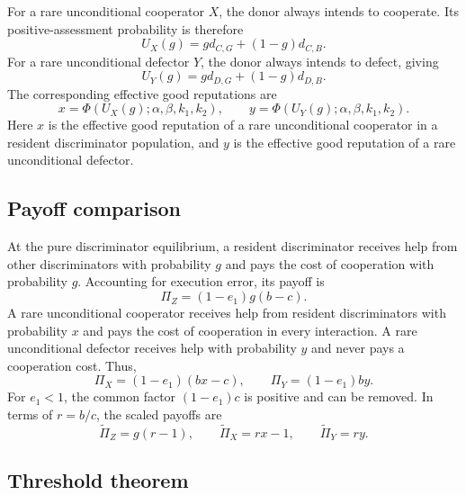 \documentclass[fleqn,10pt]{wlscirep}
\begin{document}
For a rare unconditional cooperator $X$, the donor always intends to cooperate. Its positive-assessment probability is therefore
\begin{equation}
\label{eq:allc-mutant-positive-prob}
U_X(g)=gd_{C,G}+(1-g)d_{C,B}.
\end{equation}
For a rare unconditional defector $Y$, the donor always intends to defect, giving
\begin{equation}
\label{eq:alld-mutant-positive-prob}
U_Y(g)=gd_{D,G}+(1-g)d_{D,B}.
\end{equation}
The corresponding effective good reputations are
\begin{equation}
\label{eq:mutant-effective-reputations}
x=\Phi\!\left(U_X(g);\alpha,\beta,k_1,k_2\right),\qquad
y=\Phi\!\left(U_Y(g);\alpha,\beta,k_1,k_2\right).
\end{equation}
Here $x$ is the effective good reputation of a rare unconditional cooperator in a resident discriminator population, and $y$ is the effective good reputation of a rare unconditional defector.

\subsection*{Payoff comparison}

At the pure discriminator equilibrium, a resident discriminator receives help from other discriminators with probability $g$ and pays the cost of cooperation with probability $g$. Accounting for execution error, its payoff is
\[
\Pi_Z=(1-e_1)g(b-c).
\]
A rare unconditional cooperator receives help from resident discriminators with probability $x$ and pays the cost of cooperation in every interaction. A rare unconditional defector receives help with probability $y$ and never pays a cooperation cost. Thus,
\[
\Pi_X=(1-e_1)(bx-c),\qquad
\Pi_Y=(1-e_1)by.
\]
For $e_1<1$, the common factor $(1-e_1)c$ is positive and can be removed. In terms of $r=b/c$, the scaled payoffs are
\begin{equation}
\label{eq:scaled-payoffs-pure-disc}
\widetilde\Pi_Z=g(r-1),\qquad
\widetilde\Pi_X=rx-1,\qquad
\widetilde\Pi_Y=ry.
\end{equation}

\subsection*{Threshold theorem}
\end{document}
